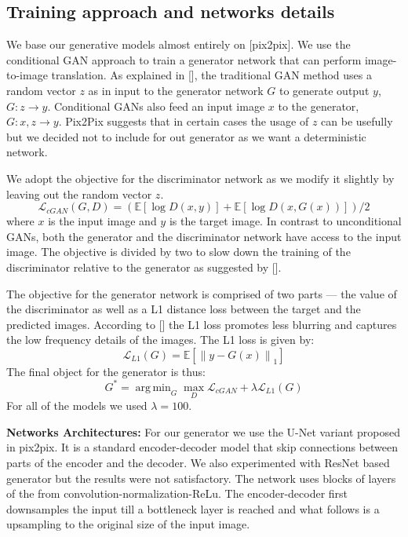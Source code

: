\documentclass{llncs}
\DeclareMathOperator*{\argminA}{arg\,min} %
\begin{document}
\subsection{Training approach and networks details}
We base our generative models almost entirely on [pix2pix]. We use the conditional GAN approach to train a generator network that can perform image-to-image translation. As explained in [], the traditional GAN method uses a random vector $z$ as in input to the generator network $G$ to generate output $y$, $G:z \rightarrow y$. Conditional GANs also feed an input image $x$ to the generator, $G: x,z \rightarrow y$. Pix2Pix suggests that in certain cases the usage of $z$ can be usefully but we decided not to include for out generator as we want a deterministic network.

We adopt the objective for the discriminator network as we modify it slightly by leaving out the random vector $z$.
\begin{equation}
\mathcal{L}_{cGAN} (G, D) = (\mathbb{E}[\log D (x,y)] + \mathbb{E}[\log D (x, G(x))])/2
\end{equation}
where $x$ is the input image and $y$ is the target image. In contrast to unconditional GANs, both the generator and the discriminator network have access to the input image. The objective is divided by two to slow down the training of the discriminator relative to the generator as suggested by [].

The objective for the generator network is comprised of two parts --- the value of the discriminator as well as a L1 distance loss between the target and the predicted images. According to [] the L1 loss promotes less blurring and captures the low frequency details of the images. The L1 loss is given by:
\begin{equation}
\mathcal{L}_{L1} (G) = \mathbb{E}[\left\lVert y - G(x)\right\rVert_1]
\end{equation}
The final object for the generator is thus:
\begin{equation}
G^* = \argminA_G \max_D \mathcal{L}_{cGAN}  + \lambda \mathcal{L}_{L1} (G)
\end{equation}
For all of the models we used $\lambda = 100$.

\noindent\textbf{Networks Architectures:} For our generator we use the U-Net variant proposed in pix2pix. It is a standard encoder-decoder model that skip connections between parts of the encoder and the decoder. We also experimented with ResNet based generator but the results were not satisfactory. The network uses blocks of layers of the from convolution-normalization-ReLu. The encoder-decoder first downsamples the input till a bottleneck layer is reached and what follows is a upsampling to the original size of the input image.
\end{document}
